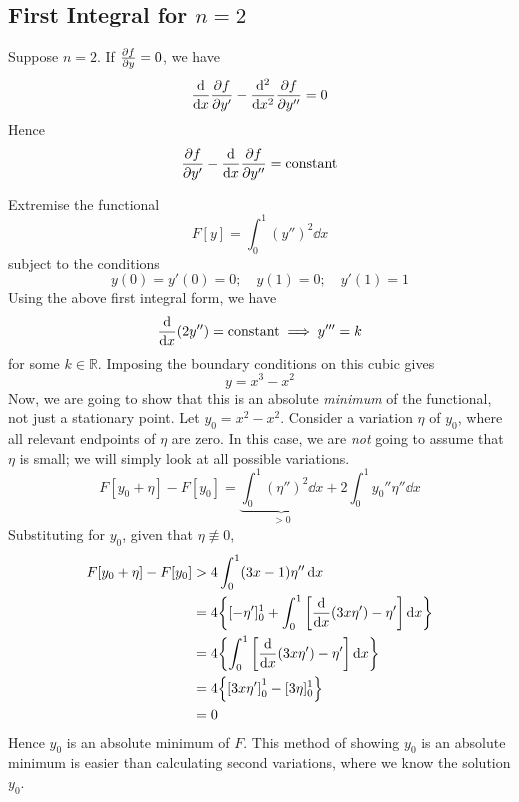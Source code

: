 \subsection{First Integral for \( n = 2 \)}
Suppose \( n = 2 \). If \(\pdv{f}{y} = 0\), we have
\[ \dv{x}\pdv{f}{y'} - \dv[2]{x}\pdv{f}{y''} = 0 \]
Hence
\[ \pdv{f}{y'} - \dv{x}\pdv{f}{y''} = \text{constant} \]

\begin{example}
    Extremise the functional
    \[ F[y] = \int_0^1 (y'')^2 \dd{x} \]
    subject to the conditions
    \[ y(0) = y'(0) = 0;\quad y(1) = 0;\quad y'(1) = 1 \]
    Using the above first integral form, we have
    \[ \dv{x}(2y'') = \text{constant} \implies y''' = k \]
    for some \( k \in \mathbb R \).
    Imposing the boundary conditions on this cubic gives
    \[ y = x^3 - x^2 \]
    Now, we are going to show that this is an absolute \textit{minimum} of the functional, not just a stationary point.
    Let \( y_0 = x^2 - x^2 \). Consider a variation \( \eta \) of \( y_0 \), where all relevant endpoints of \( \eta \) are zero.
    In this case, we are \textit{not} going to assume that \( \eta \) is small; we will simply look at all possible variations.
    \[ F[y_0 + \eta] - F[y_0] = \underbrace{\int_0^1 (\eta'')^2 \dd{x}}_{> 0} + 2\int_0^1 y_0'' \eta'' \dd{x} \]
    Substituting for \( y_0 \), given that \( \eta \not\equiv 0 \),
    \begin{align*}
        F[y_0 + \eta] - F[y_0] & > 4 \int_0^1 (3x-1)\eta'' \dd{x} \\
        &= 4\qty{[-\eta']_0^1 + \int_0^1\qty[\dv{x}(3x\eta') - \eta']\dd{x}} \\
        &= 4\qty{\int_0^1\qty[\dv{x}(3x\eta') - \eta']\dd{x}} \\
        &= 4\qty{\qty[3x\eta']_0^1 - [3\eta]_0^1} \\
        &= 0
    \end{align*}
    Hence \( y_0 \) is an absolute minimum of \( F \).
    This method of showing \( y_0 \) is an absolute minimum is easier than calculating second variations, where we know the solution \( y_0 \).
\end{example}

